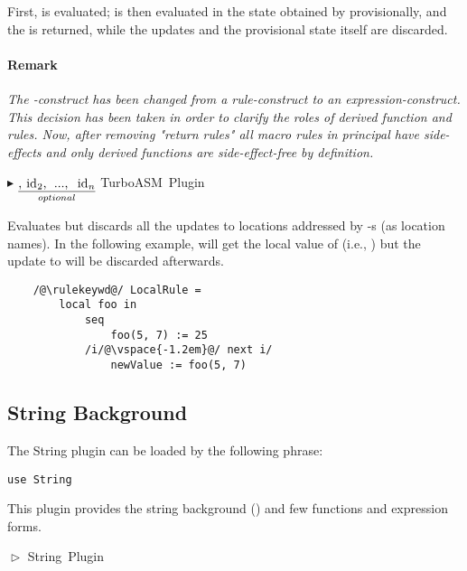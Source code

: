 \documentclass{article}
\makeatletter
\newcommand{\ruleform}[2]{\pform{$\blacktriangleright$}{#1}{#2}}
\newcommand{\opform}[2]{\pform{$\vartriangleright$}{#1}{#2}}
\newcommand{\pform}[3]{\vspace*{4mm} \noindent #1 #2 \vspace{1mm}\textcolor[gray]{0.7}{\dotfill}\mbox{{\sffamily \footnotesize #3}}}
\newcommand{\optional}[1]{$\underset{optional}{\underline{\mbox{#1}}}$}
\newcommand{\indexrule}[1]{\index{#1 rule@\asm{#1} rule}}
\makeatother
\begin{document}
First,  is evaluated;  is then evaluated in the state obtained by provisionally, and the  is returned, while 
the updates and the provisional state itself are discarded.

\paragraph{Remark}
\textit{The -construct has been changed from a \emph{rule}-construct to an \emph{expression}-construct. This decision has been taken in order to clarify the roles of derived function and rules. Now, after removing "return rules" all macro rules in principal have side-effects and only derived functions are side-effect-free by definition.}

\ruleform{
	\hspace{-.4em}
	\optional{, \asm{id$_2$, ..., id$_n$}}
	\asm{in rule}
}{TurboASM Plugin}
\indexrule{local}

Evaluates  but discards all the updates to locations addressed by -s (as location names). 
In the following example,  will get the local value of  (i.e., ) 
but the update to  will be discarded afterwards.

\begin{lstlisting}
	/@\rulekeywd@/ LocalRule =
		local foo in
			seq
				foo(5, 7) := 25
			/i/@\vspace{-1.2em}@/ next i/
				newValue := foo(5, 7)
\end{lstlisting}
\vspace{-1em}
\subsection{String Background}
\label{string}

The String plugin can be loaded by the following  phrase:

\begin{lstlisting}
use String
\end{lstlisting}

\noindent This plugin provides the string background () and
few functions and expression forms. 

\opform{
}{String Plugin}
\end{document}
